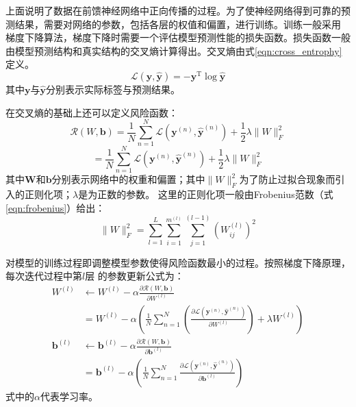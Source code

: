 上面说明了数据在前馈神经网络中正向传播的过程。为了使神经网络得到可靠的预测结果，需要对网络的参数，包括各层的权值和偏置，进行训练。训练一般采用
梯度下降算法，梯度下降时需要一个评估模型预测性能的损失函数。损失函数一般由模型预测结构和真实结构的交叉熵计算得出。交叉熵由式\ref{eqn:cross_entrophy}定义。
\begin{equation}
\label{eqn:cross_entrophy} 
\mathcal{L}(\mathbf{y}, \hat{\mathbf{y}})=-\mathbf{y}^{\mathrm{T}} \log \hat{\mathbf{y}}
 \end{equation}
其中$\mathbf{y}$与$\hat{\mathbf{y}}$分别表示实际标签与预测结果。

在交叉熵的基础上还可以定义风险函数：
\begin{equation} 
\mathcal{R}(W, \mathbf{b})=\frac{1}{N} \sum_{n=1}^{N} \mathcal{L}\left(\mathbf{y}^{(n)}, \hat{\mathbf{y}}^{(n)}\right)+\frac{1}{2} \lambda\|W\|_{F}^{2}
\end{equation}
\begin{equation} 
=\frac{1}{N} \sum_{n=1}^{N} \mathcal{L}\left(\mathbf{y}^{(n)}, \hat{\mathbf{y}}^{(n)}\right)+\frac{1}{2} \lambda\|W\|_{F}^{2}
\end{equation}
其中$\mathbf{W}$和$\mathbf{b}$分别表示网络中的权重和偏置；其中$\|W\|_{F}^{2}$为了防止过拟合现象而引入的正则化项；$\lambda$是为正数的参数。
这里的正则化项一般由Frobenius范数（式\ref{eqn:frobenius}）给出：
\begin{equation} 
\label{eqn:frobenius}
\|W\|_{F}^{2}=\sum_{l=1}^{L} \sum_{i=1}^{m^{(l)}} \sum_{j=1}^{(l-1)}\left(W_{i j}^{(l)}\right)^{2}
\end{equation}

对模型的训练过程即调整模型参数使得风险函数最小的过程。按照梯度下降原理，每次迭代过程中第$l$层
的参数更新公式为：
\begin{equation} 
\begin{aligned} W^{(l)} & \leftarrow W^{(l)}-\alpha \frac{\partial \mathcal{R}(W, \mathbf{b})}{\partial W^{(l)}} \\ &=W^{(l)}-\alpha\left(\frac{1}{N} \sum_{n=1}^{N}\left(\frac{\partial \mathcal{L}\left(\mathbf{y}^{(n)}, \hat{\mathbf{y}}^{(n)}\right)}{\partial W^{(l)}}\right)+\lambda W^{(l)}\right) \\ \mathbf{b}^{(l)} & \leftarrow \mathbf{b}^{(l)}-\alpha \frac{\partial \mathcal{R}(W, \mathbf{b})}{\partial \mathbf{b}^{(l)}} \\ &=\mathbf{b}^{(l)}-\alpha\left(\frac{1}{N} \sum_{n=1}^{N} \frac{\partial \mathcal{L}\left(\mathbf{y}^{(n)}, \hat{\mathbf{y}}^{(n)}\right)}{\partial \mathbf{b}^{(l)}}\right) \end{aligned}
\end{equation}
式中的$\alpha$代表学习率。


